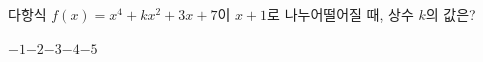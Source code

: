 다항식 $f(x)=x^4+kx^2+3x+7$이 $x+1$로 나누어떨어질 때, 상수 $k$의 값은?
\begin{choices32}{$-1$}{$-2$}{$-3$}{$-4$}{$-5$}\end{choices32}
